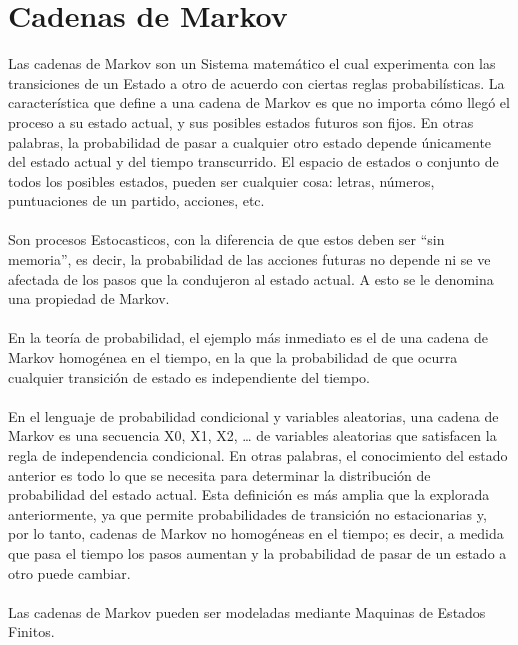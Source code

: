 \documentclass[12pt, a4paper, titlepage]{report}
\begin{document}
		\section{Cadenas de Markov}
	    Las cadenas de Markov son un \gls{Sistema} matemático el cual experimenta con las transiciones de un \gls{Estado} a otro de acuerdo con ciertas reglas probabilísticas. La característica que define a una cadena de Markov es que no importa cómo llegó el proceso a su estado actual, y sus posibles estados futuros son fijos. En otras palabras, la probabilidad de pasar a cualquier otro estado depende únicamente del estado actual y del tiempo transcurrido. El espacio de estados o conjunto de todos los posibles estados, pueden ser cualquier cosa: letras, números, puntuaciones de un partido, acciones, etc.\\\\
		Son procesos \gls{Estocastico}s, con la diferencia de que estos deben ser “sin memoria”, es decir, la probabilidad de las acciones futuras no depende ni se ve afectada de los pasos que la condujeron al estado actual. A esto se le denomina una propiedad de Markov.\\\\
		En la teoría de probabilidad, el ejemplo más inmediato es el de una cadena de Markov homogénea en el tiempo, en la que la probabilidad de que ocurra cualquier transición de estado es independiente del tiempo.\\\\
		En el lenguaje de probabilidad condicional y variables aleatorias, una cadena de Markov es una secuencia X0, X1, X2, … de variables aleatorias que satisfacen la regla de independencia condicional.
		En otras palabras, el conocimiento del estado anterior es todo lo que se necesita para determinar la distribución de probabilidad del estado actual. Esta definición es más amplia que la explorada anteriormente, ya que permite probabilidades de transición no estacionarias y, por lo tanto, cadenas de Markov no homogéneas en el tiempo; es decir, a medida que pasa el tiempo los pasos aumentan y la probabilidad de pasar de un estado a otro puede cambiar. \cite{refMarkov}\\\\
		Las cadenas de Markov pueden ser modeladas mediante \gls{Maquinas de Estados Finitos}.\par
\end{document}
